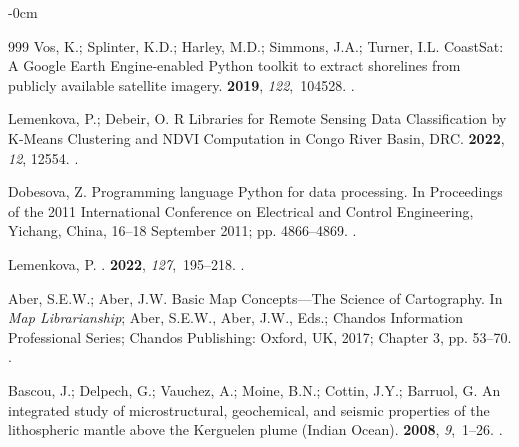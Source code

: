 \documentclass[geomatics,article,accept,pdftex,moreauthors]{Definitions/mdpi}
\begin{document}
\begin{adjustwidth}{-\extralength}{0cm}
\begin{thebibliography}{999}
Vos, K.; Splinter, K.D.; Harley, M.D.; Simmons, J.A.; Turner, I.L.
\newblock CoastSat: A Google Earth Engine-enabled Python toolkit to extract
  shorelines from publicly available satellite imagery.
 {\bf 2019}, {\em
  122},~104528.
.

Lemenkova, P.; Debeir, O.
\newblock R Libraries for Remote Sensing Data Classification by K-Means
  Clustering and NDVI Computation in Congo River Basin, DRC.
 {\bf 2022}, {\em 12}, 12554. %
.

Dobesova, Z.
\newblock Programming language Python for data processing.
\newblock In Proceedings of the 2011 International Conference on Electrical and
  Control Engineering, Yichang, China, 16--18 September 2011; pp. 4866--4869. %
.

Lemenkova, P.
.
 {\bf 2022}, {\em 127},~195--218.
.

Aber, S.E.W.; Aber, J.W.
\newblock Basic Map Concepts—The Science of Cartography. In {\em
  Map Librarianship}; Aber, S.E.W., Aber, J.W., Eds.; Chandos Information
  Professional Series; Chandos Publishing: Oxford,  UK, 2017; Chapter 3, pp. 53--70.
.

Bascou, J.; Delpech, G.; Vauchez, A.; Moine, B.N.; Cottin, J.Y.; Barruol, G.
\newblock An integrated study of microstructural, geochemical, and seismic
  properties of the lithospheric mantle above the Kerguelen plume (Indian
  Ocean).
 {\bf 2008}, \emph{9},~1--26. %
.


\end{thebibliography}
\end{adjustwidth}
\end{document}
